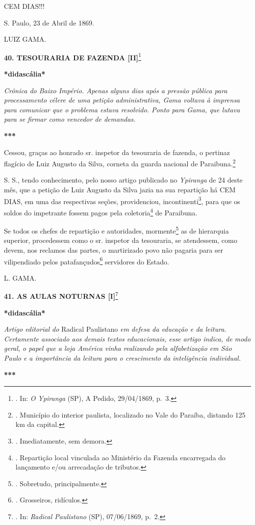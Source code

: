 CEM DIAS!!!

S. Paulo, 23 de Abril de 1869.

LUIZ GAMA.

\textbf{40. TESOURARIA DE FAZENDA {[}II{]}}\footnote{. In: \emph{O
  Ypiranga} (SP), A Pedido, 29/04/1869, p.~3.}

\textbf{*didascália*}

\emph{Crônica do Baixo Império. Apenas alguns dias após a pressão
pública para processamento célere de uma petição administrativa, Gama
voltava à imprensa para comunicar que o problema estava resolvido. Ponto
para Gama, que lutava para se firmar como vencedor de demandas.}

\textbf{***}

Cessou, graças ao honrado sr. inspetor da tesouraria de fazenda, o
pertinaz flagício de Luiz Augusto da Silva, corneta da guarda nacional
de Paraibuna.\footnote{. Município do interior paulista, localizado no
  Vale do Paraíba, distando 125 km da capital.}

S. S., tendo conhecimento, pelo nosso artigo publicado no
\emph{Ypiranga} de 24 deste mês, que a petição de Luiz Augusto da Silva
jazia na sua repartição há CEM DIAS, em uma das respectivas seções,
providenciou, incontinenti\footnote{. Imediatamente, sem demora.}, para
que os soldos do impetrante fossem pagos pela coletoria\footnote{.
  Repartição local vinculada ao Ministério da Fazenda encarregada do
  lançamento e/ou arrecadação de tributos.} de Paraibuna.

Se todos os chefes de repartição e autoridades, mormente\footnote{.
  Sobretudo, principalmente.} as de hierarquia superior, procedessem
como o sr. inspetor da tesouraria, se atendessem, como devem, nos
reclamos das partes, o martirizado povo não pagaria para ser
vilipendiado pelos patafançudos\footnote{. Grosseiros, ridículos.}
servidores do Estado.

L. GAMA.

\textbf{41. AS AULAS NOTURNAS {[}I{]}}\footnote{. In: \emph{Radical
  Paulistano} (SP), 07/06/1869, p.~2.}

\textbf{*didascália*}

\emph{Artigo editorial do} Radical Paulistano \emph{em defesa da
educação e da leitura. Certamente associado aos demais textos
educacionais, esse artigo indica, de modo geral, o papel que a loja
América vinha realizando pela alfabetização em São Paulo e a importância
da leitura para o crescimento da inteligência individual.}

\textbf{***}

